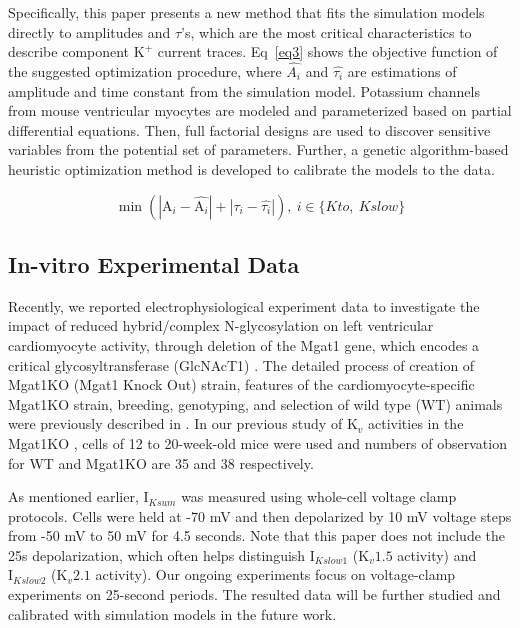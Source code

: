 \documentclass[10pt,letterpaper]{article}
\begin{document}
Specifically, this paper presents a new method that fits the simulation models directly to amplitudes and $\tau$'s, which are the most critical characteristics to describe component $\text{K}^{+}$ current traces. Eq~\ref{eq3} shows the objective function of the suggested optimization procedure, where $\hat{A_i}$ and $\hat{\tau_i}$ are estimations of amplitude and time constant from the simulation model. Potassium channels from mouse ventricular myocytes are modeled and parameterized based on partial differential equations. Then, full factorial designs are used to discover sensitive variables from the potential set of parameters. Further, a genetic algorithm-based heuristic optimization method is developed to calibrate the models to the data.

\begin{equation}
    \min (|\text{A}_i - \hat{\text{A}_i}| + |\tau_i - \hat{\tau_i}|), \ i \in \{Kto,\ Kslow\}
    \label{eq3}
\end{equation}

\subsection*{In-vitro Experimental Data}
Recently, we reported electrophysiological experiment data to investigate the impact of reduced hybrid/complex N-glycosylation on left ventricular cardiomyocyte activity, through deletion of the Mgat1 gene, which encodes a critical glycosyltransferase (GlcNAcT1) \cite{ednie2019reduced, ednie2019reduced2}. The detailed process of creation of Mgat1KO (Mgat1 Knock Out) strain, features of the cardiomyocyte-specific Mgat1KO strain, breeding, genotyping, and selection of wild type (WT) animals were previously described in \cite{ednie2019reduced2}. In our previous study of $\text{K}_{v}$ activities in the Mgat1KO \cite{ednie2019reduced}, cells of 12 to 20-week-old mice were used and numbers of observation for WT and Mgat1KO are 35 and 38 respectively.

As mentioned earlier, $\text{I}_{Ksum}$ was measured using whole-cell voltage clamp protocols. Cells were held at -70 mV and then depolarized by 10 mV voltage steps from -50 mV to 50 mV for 4.5 seconds. Note that this paper does not include the 25s depolarization, which often helps distinguish $\text{I}_{Kslow1}$ ($\text{K}_{v}1.5$ activity) and $\text{I}_{Kslow2}$ ($\text{K}_{v}2.1$ activity). Our ongoing experiments focus on voltage-clamp experiments on 25-second periods. The resulted data will be further studied and calibrated with simulation models in the future work.
\end{document}
